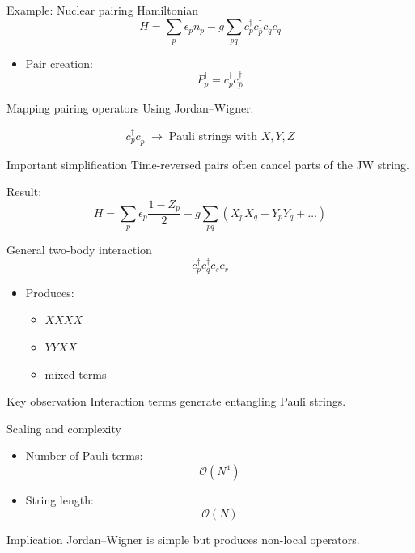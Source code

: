 \documentclass[aspectratio=169]{beamer}
\begin{document}
\begin{frame}{Example: Nuclear pairing Hamiltonian}
\[
H = \sum_p \epsilon_p n_p 
- g \sum_{pq} c^\dagger_p c^\dagger_{\bar p} c_{\bar q} c_q
\]

\begin{itemize}
\item Pair creation:
\[
P_p^\dagger = c^\dagger_p c^\dagger_{\bar p}
\]
\end{itemize}
\end{frame}

\begin{frame}{Mapping pairing operators}
Using Jordan--Wigner:

\[
c^\dagger_p c^\dagger_{\bar p}
\;\rightarrow\;
\text{Pauli strings with } X,Y,Z
\]

\medskip

\begin{block}{Important simplification}
Time-reversed pairs often cancel parts of the JW string.
\end{block}

\medskip

Result:
\[
H = \sum_p \epsilon_p \frac{1-Z_p}{2}
- g \sum_{pq} (X_p X_q + Y_p Y_q + \dots)
\]
\end{frame}

\begin{frame}{General two-body interaction}
\[
c^\dagger_p c^\dagger_q c_s c_r
\]

\begin{itemize}
\item Produces:
\begin{itemize}
\item $X X X X$
\item $Y Y X X$
\item mixed terms
\end{itemize}
\end{itemize}

\medskip

\begin{block}{Key observation}
Interaction terms generate entangling Pauli strings.
\end{block}
\end{frame}

\begin{frame}{Scaling and complexity}
\begin{itemize}
\item Number of Pauli terms:
\[
\mathcal{O}(N^4)
\]
\item String length:
\[
\mathcal{O}(N)
\]
\end{itemize}

\medskip

\begin{block}{Implication}
Jordan--Wigner is simple but produces non-local operators.
\end{block}
\end{frame}
\end{document}
